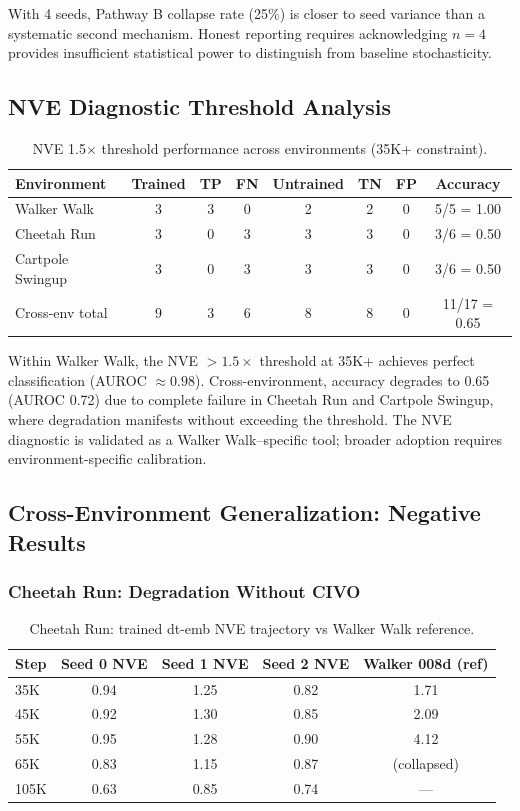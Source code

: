 \documentclass[10pt,letterpaper]{article}
\begin{document}
With 4 seeds, Pathway B collapse rate (25\%) is closer to seed variance than a systematic second mechanism. Honest reporting requires acknowledging $n=4$ provides insufficient statistical power to distinguish from baseline stochasticity.

\subsection{NVE Diagnostic Threshold Analysis}

\begin{table}[h]
\centering
\caption{NVE 1.5$\times$ threshold performance across environments (35K+ constraint).}
\label{tab:nve_crossenv}
\begin{tabular}{lccccccc}
\toprule
Environment & Trained & TP & FN & Untrained & TN & FP & Accuracy \\
\midrule
Walker Walk & 3 & 3 & 0 & 2 & 2 & 0 & 5/5 = 1.00 \\
Cheetah Run & 3 & 0 & 3 & 3 & 3 & 0 & 3/6 = 0.50 \\
Cartpole Swingup & 3 & 0 & 3 & 3 & 3 & 0 & 3/6 = 0.50 \\
\midrule
Cross-env total & 9 & 3 & 6 & 8 & 8 & 0 & 11/17 = 0.65 \\
\bottomrule
\end{tabular}
\end{table}

Within Walker Walk, the NVE $> 1.5\times$ threshold at 35K+ achieves perfect classification (AUROC $\approx 0.98$). Cross-environment, accuracy degrades to 0.65 (AUROC 0.72) due to complete failure in Cheetah Run and Cartpole Swingup, where degradation manifests without exceeding the threshold. The NVE diagnostic is validated as a Walker Walk--specific tool; broader adoption requires environment-specific calibration.

\subsection{Cross-Environment Generalization: Negative Results}

\subsubsection{Cheetah Run: Degradation Without CIVO}

\begin{table}[h]
\centering
\caption{Cheetah Run: trained dt-emb NVE trajectory vs Walker Walk reference.}
\label{tab:cheetah_nve}
\begin{tabular}{lcccc}
\toprule
Step & Seed 0 NVE & Seed 1 NVE & Seed 2 NVE & Walker 008d (ref) \\
\midrule
35K & 0.94 & 1.25 & 0.82 & 1.71 \\
45K & 0.92 & 1.30 & 0.85 & 2.09 \\
55K & 0.95 & 1.28 & 0.90 & 4.12 \\
65K & 0.83 & 1.15 & 0.87 & (collapsed) \\
105K & 0.63 & 0.85 & 0.74 & --- \\
\bottomrule
\end{tabular}
\end{table}
\end{document}
